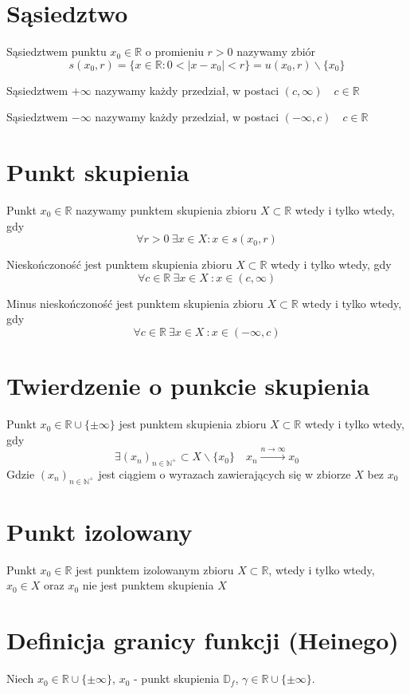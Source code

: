 \documentclass[11pt]{article}
\begin{document}
\section{Sąsiedztwo}
Sąsiedztwem punktu $x_0 \in \mathbb{R}$ o promieniu $ r > 0$ nazywamy zbiór
$$ s(x_0,r) = \{ x \in \mathbb{R} :  0 < | x - x_0 | < r \} = u(x_0,r) \backslash \{x_0\}$$

Sąsiedztwem $+\infty$ nazywamy każdy przedział, w postaci $(c,\infty) \quad c \in \mathbb{R}$

Sąsiedztwem $-\infty$ nazywamy każdy przedział, w postaci $(-\infty,c) \quad c \in \mathbb{R}$

\section{Punkt skupienia}
Punkt $x_0 \in \mathbb{R}$ nazywamy punktem skupienia zbioru $X \subset \mathbb{R}$ wtedy i tylko wtedy, gdy 
$$ \forall r > 0\ \exists x \in X : x \in s(x_0,r)$$

Nieskończoność jest punktem skupienia zbioru $X \subset \mathbb{R}$ wtedy i tylko wtedy, gdy $$ \forall c \in \mathbb{R} \ \exists x \in X\ : x \in (c,\infty)$$

Minus nieskończoność jest punktem skupienia zbioru $X \subset \mathbb{R}$ wtedy i tylko wtedy, gdy $$ \forall c \in \mathbb{R} \ \exists x \in X\ : x \in (-\infty,c)$$

\section{Twierdzenie o punkcie skupienia}
Punkt $x_0 \in \mathbb{R} \cup \{ \pm \infty \}$ jest punktem skupienia zbioru $X \subset \mathbb{R}$ wtedy i tylko wtedy, gdy $$ \exists (x_n)_{n \in \mathbb{N}^+} \subset X \backslash\{x_0\} \quad x_n \xrightarrow{n \to \infty}x_0$$
Gdzie $(x_n)_{n \in \mathbb{N}^+}$ jest ciągiem o wyrazach zawierających się w zbiorze $X$ bez $x_0$

\section{Punkt izolowany}
Punkt $ x_0 \in \mathbb{R}$ jest punktem izolowanym zbioru $ X \subset \mathbb{R}$, wtedy i tylko wtedy, $x_0 \in X$ oraz $x_0$ nie jest punktem skupienia $X$

\section{Definicja granicy funkcji (Heinego)}
Niech $x_0 \in \mathbb{R} \cup \{ \pm \infty \}$, $x_0$ - punkt skupienia $\mathbb{D}_f$, $\gamma \in \mathbb{R} \cup \{ \pm \infty \}$.
\end{document}
